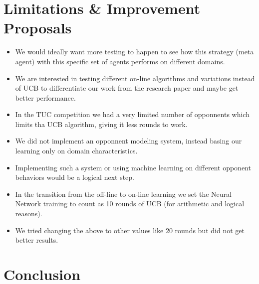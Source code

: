 \documentclass[12pt]{article}
\numberwithin{equation}{section}
\begin{document}
	\section{Limitations \& Improvement Proposals}		\label{sec:limitations_improvements}
	
		\begin{itemize}
			\item We would ideally want more testing to happen to see how this strategy (meta agent) with this specific set of agents performs on different domains.
			\item We are interested in testing different on-line algorithms and variations instead of UCB to differentiate our work from the research paper \cite{meta_agent_paper} and maybe get better performance.
			\item In the TUC competition we had a very limited number of opponnents which limits tha UCB algorithm, giving it less rounds to work.
			\item We did not implement an opponnent modeling system, instead basing our learning only on domain characteristics.
			\item Implementing such a system or using machine learning on different opponent behaviors would be a logical next step.
			\item In the transition from the off-line to on-line learning we set the Neural Network training to count as 10 rounds of UCB (for arithmetic and logical reasons).
			\item We tried changing the above to other values like 20 rounds but did not get better results.
		\end{itemize}

	\section*{Conclusion}		\label{sec:conclusion}



	
	
\end{document}
